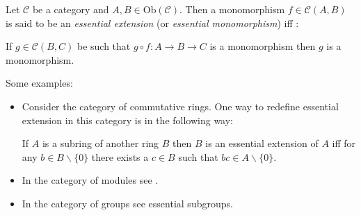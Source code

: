 \documentclass[12pt]{article}
\begin{document}
Let $\mathcal C$ be a category and $A,B \in \mathrm{Ob}(\mathcal C)$.  Then a monomorphism 
$f \in \mathcal C(A,B)$ is said to be an \emph{essential extension} (or \emph{essential monomorphism}) iff : 


If $g\in\mathcal C(B,C)$ be such that $g \circ f : A\rightarrow B\rightarrow C$ is a monomorphism then 
$g$ is a monomorphism.

Some examples:
\begin{itemize}

\item Consider the category of commutative rings. One way to redefine essential extension in this category is in the following way: 

If $A$ is a subring of another ring $B$ then $B$ is an essential extension of $A$ iff for any $b\in B\backslash\{0\}$ there exists a $c\in B$ such that $bc \in A\backslash\{0\}$.

\item In the category of modules see .

\item In the category of groups see essential subgroups.

\end{itemize}
\end{document}
